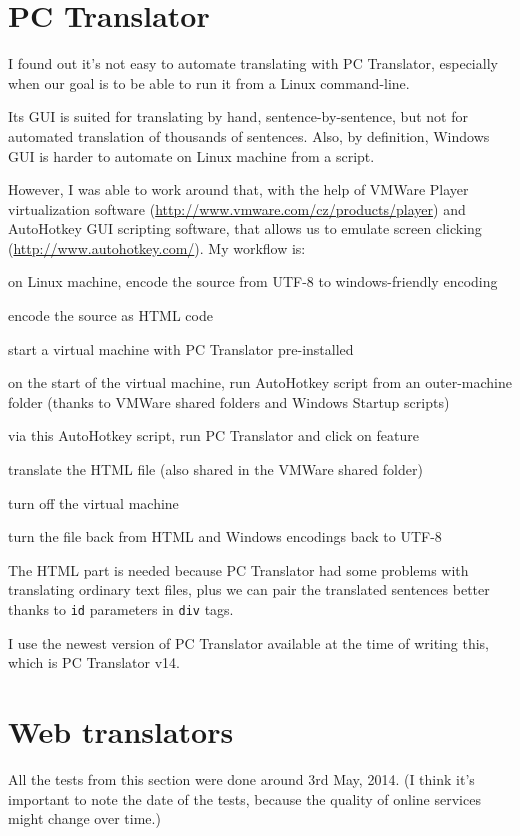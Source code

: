 \section{PC Translator}
\label{experiments:langsoft}
I found out it's not easy to automate translating with PC Translator, especially when our goal is to be able to run it from a Linux command-line.

Its GUI is suited for translating by hand, sentence-by-sentence, but not for automated translation of thousands of sentences. Also, by definition, Windows GUI is harder to automate on Linux machine from a script.

However, I was able to work around that, with the help of VMWare Player virtualization software (\url{http://www.vmware.com/cz/products/player}) and Au\-to\-Hot\-key GUI scripting software, that allows us to emulate screen clicking (\url{http://www.autohotkey.com/}). My workflow is:

\begin{pitemize}
\item on Linux machine, encode the source from UTF-8 to windows-friendly encoding
\item encode the source as HTML code
\item start a virtual machine with PC Translator pre-installed
\item on the start of the virtual machine, run AutoHotkey script from an outer-machine folder (thanks to VMWare shared folders and Windows Startup scripts)
\item via this AutoHotkey script, run PC Translator and click on  feature 
\item translate the HTML file (also shared in the VMWare shared folder)
\item turn off the virtual machine
\item turn the file back from HTML and Windows encodings back to UTF-8
\end{pitemize}

The HTML part is needed because PC Translator had some problems with translating ordinary text files, plus we can pair the translated sentences better thanks to \texttt{id} parameters in \texttt{div} tags.

I use the newest version of PC Translator available at the time of writing this, which is PC Translator v14.

\section{Web translators}
All the tests from this section were done around 3rd May, 2014. (I think it's important to note the date of the tests, because the quality of online services might change over time.)

